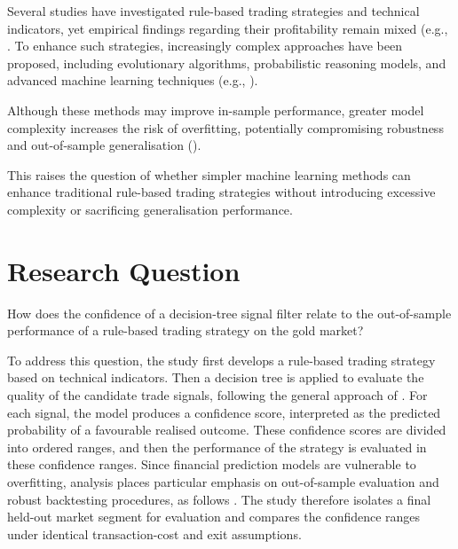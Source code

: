 Several studies have investigated rule-based trading strategies and technical indicators, yet empirical findings regarding their profitability remain mixed (e.g., \cite{lento2007profitability, curcio1997technical}. To enhance such strategies, increasingly complex approaches have been proposed, including evolutionary algorithms, probabilistic reasoning models, and advanced machine learning techniques (e.g., \cite{potvin2004generating, chou2014rule, sukma2025enhancing}).

Although these methods may improve in-sample performance, greater model complexity increases the risk of overfitting, potentially compromising robustness and out-of-sample generalisation (\cite{dietterich1995overfitting, hawkins2004problem}). 

\begin{problemformulation}
\label{problemformulationOne}
This raises the question of whether simpler machine learning methods can enhance traditional rule-based trading strategies without introducing excessive complexity or sacrificing generalisation performance.

\end{problemformulation}



\section{Research Question}


\begin{researchquestion}
\label{researchQuestion}

How does the confidence of a decision-tree signal filter relate to the out-of-sample performance of a rule-based trading strategy on the gold market?

\end{researchquestion} 

To address this question, the study first develops a rule-based trading strategy
based on technical indicators. Then a decision tree is applied to evaluate the
quality of the candidate trade signals, following the general approach of
\citet{nugroho2014decision}. For each signal, the model produces a confidence
score, interpreted as the predicted probability of a favourable realised outcome.
These confidence scores are divided into ordered ranges, and then the
performance of the strategy is evaluated in these confidence ranges. Since
financial prediction models are vulnerable to overfitting, analysis places
particular emphasis on out-of-sample evaluation and robust backtesting
procedures, as follows \citet{bailey2017pbo}. The study therefore isolates a
final held-out market segment for evaluation and compares the confidence ranges
under identical transaction-cost and exit assumptions.

